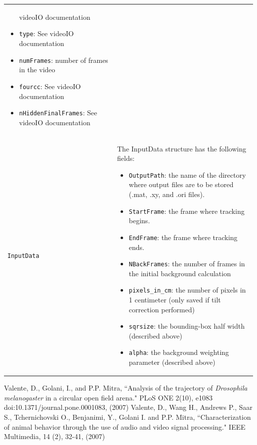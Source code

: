 \documentclass[letterpaper, 11pt]{article}
\begin{document}
\begin{center}
\begin{longtable}{ p{5cm}  p{8cm} }
\begin{itemize}
    videoIO documentation  \item \texttt{type}: See videoIO documentation \item \texttt{numFrames}:
    number of frames in the video \item \texttt{fourcc}: See videoIO documentation \item
    \texttt{nHiddenFinalFrames}: See videoIO documentation\end{itemize}\\
    \texttt{InputData} & The InputData structure
    has the following fields: \begin{itemize} \item \texttt{OutputPath}:  the name of the directory
    where output files are to be stored (.mat, .xy, and .ori files). \item \texttt{StartFrame}:
    the frame where tracking begins. \item \texttt{EndFrame}: the frame where tracking ends. \item
    \texttt{NBackFrames}: the number of frames in the initial background calculation \item \texttt{pixels\_in\_cm}: the number of pixels in 1 centimeter (only saved if tilt correction
performed)
    \item \texttt{sqrsize}: the
    bounding-box half width (described above) \item \texttt{alpha}: the background weighting
    parameter (described above)\end{itemize}\\



\end{longtable}
\end{center}



\begin{thebibliography}{9}
Valente, D., Golani, I., and P.P. Mitra, ``Analysis of the trajectory of \emph{Drosophila
melanogaster} in a circular open field arena." PLoS ONE 2(10), e1083
doi:10.1371/journal.pone.0001083, (2007)
Valente, D., Wang H., Andrews P., Saar S., Tchernichovski O., Benjanimi, Y., Golani I. and
P.P. Mitra, ``Characterization of animal behavior through the use of audio and video signal
processing." IEEE Multimedia, 14 (2), 32-41, (2007)
\end{thebibliography}
\end{document}
